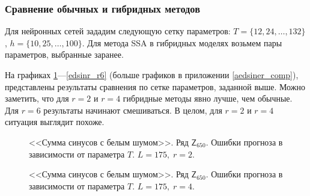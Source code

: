 \documentclass[specialist,
               substylefile = spbu.rtx,
               subf,href,colorlinks=true, 12p]{disser}
\newcommand{\multiref}[2]{\ref{#1}---\ref{#2}}
\begin{document}
\subsubsection{Сравнение обычных и гибридных методов}
\label{edsiner_comp}
Для нейронных сетей зададим следующую сетку параметров: $T = \{12, 24, \ldots, 132 \}$, $h = \{10, 25, \ldots, 100 \}$. Для метода SSA в гибридных моделях возьмем пары параметров, выбранные заранее.

На графиках \multiref{edsinr_r2}{edsinr_r6} (больше графиков в приложении \ref{aedsiner_comp}), представлены результаты сравнения по сетке параметров, заданной выше. Можно заметить, что для $r = 2$ и $r = 4$ гибридные методы явно лучше, чем обычные. Для $r = 6$ результаты начинают смешиваться. В целом, для $r = 2$ и $r = 4$ ситуация выглядит похоже.

\begin{figure}[H]
	\captionsetup{justification=centering}
	\caption{<<Сумма синусов с белым шумом>>. Ряд $\mathsf{Z}_{650}$. Ошибки прогноза в зависимости от параметра $T$. $L = 175, \; r = 2$.}
	\label{edsinr_r2}
\end{figure}

\begin{figure}[H]
	\captionsetup{justification=centering}
	\caption{<<Сумма синусов с белым шумом>>. Ряд $\mathsf{Z}_{650}$. Ошибки прогноза в зависимости от параметра $T$. $L = 175, \; r = 4$.}
	\label{edsinr_r4}
\end{figure}
\end{document}
